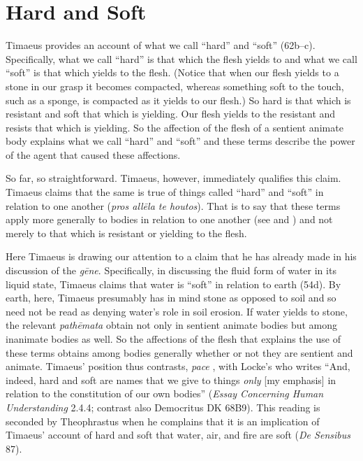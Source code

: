 
\section{Hard and Soft} %
\label{sec:hard_and_soft}

Timaeus provides an account of what we call ``hard'' and ``soft'' (62b--c). Specifically, what we call ``hard'' is that which the flesh yields to and what we call ``soft'' is that which yields to the flesh. (Notice that when our flesh yields to a stone in our grasp it becomes compacted, whereas something soft to the touch, such as a sponge, is compacted as it yields to our flesh.) So hard is that which is resistant and soft that which is yielding. Our flesh yields to the resistant and resists that which is yielding. So the affection of the flesh of a sentient animate body explains what we call ``hard'' and ``soft'' and these terms describe the power of the agent that caused these affections.

So far, so straightforward. Timaeus, however, immediately qualifies this claim. Timaeus claims that the same is true of things called ``hard'' and ``soft'' in relation to one another (\emph{pros allēla te houtos}). That is to say that these terms apply more generally to bodies in relation to one another (see \citealt[228, n6]{Archer-Hind:1888qd} and \citealt[110]{OBrien:1984ji}) and not merely to that which is resistant or yielding to the flesh.

Here Timaeus is drawing our attention to a claim that he has already made in his discussion of the \emph{gēne}. Specifically, in discussing the fluid form of water in its liquid state, Timaeus claims that water is ``soft'' in relation to earth (54d). By earth, here, Timaeus presumably has in mind stone as opposed to soil and so need not be read as denying water's role in soil erosion. If water yields to stone, the relevant \emph{pathēmata} obtain not only in sentient animate bodies but among inanimate bodies as well. So the affections of the flesh that explains the use of these terms obtains among bodies generally whether or not they are sentient and animate. Timaeus' position thus contrasts, \emph{pace} \citet[185, n2]{Beare:1906uq}, with Locke's who writes ``And, indeed, hard and soft are names that we give to things \emph{only} [my emphasis] in relation to the constitution of our own bodies'' (\emph{Essay Concerning Human Understanding} 2.4.4; contrast also Democritus DK 68B9). This reading is seconded by Theophrastus when he complains that it is an implication of Timaeus' account of hard and soft that water, air, and fire are soft (\emph{De Sensibus} 87).

